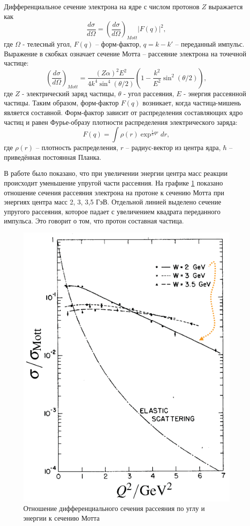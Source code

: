 \documentclass{extarticle}
\begin{document}
Дифференциальное сечение электрона на ядре с числом протонов $Z$ выражается как 
\begin{equation}
    \frac{d\sigma}{d\Omega} = ( \frac{d\sigma}{d\Omega})_{Mott} |F(q)|^2 ,
\end{equation}
где $\Omega$ - телесный угол, $F(q)$ -- форм-фактор, $q = k-k'$ -- переданный импульс. Выражение в скобках означает сечение Мотта -- рассеяние электрона на точечной частице:
\begin{equation}
    (\frac{d\sigma}{d\Omega})_{Mott} = \frac{(Z\alpha)^2 E^2}{4k^4 \sin^4 (\theta/2)} (1- \frac{k^2}{E^2} \sin^2(\theta/2)),
\end{equation}
где $Z$ - электрический заряд частицы, $\theta$ - угол рассеяния, $E$ - энергия рассеянной частицы. Таким образом, форм-фактор $F(q)$ возникает, когда частица-мишень является составной. Форм-фактор зависит от распределения составляющих ядро частиц и равен Фурье-образу плотности распределения электрического заряда:
\begin{equation}
    F(q) = \int \rho(r) \exp^{\frac{i}{\hbar}qr}dr,
\end{equation}
где $\rho(r)$ -- плотность распределения, $r$ -- радиус-вектор из центра ядра, $\hbar$ -- приведённая постоянная Планка.

В работе \cite{Breidenbach} было показано, что при увеличении энергии центра масс реакции происходит уменьшение упругой части рассеяния. На графике \ref{fig:Mott} показано отношение сечения рассеяния электрона на протоне к сечению Мотта при энергиях центра масс 2, 3, 3,5 ГэВ. Отдельной линией выделено сечение упругого рассеяния, которое падает с увеличением квадрата переданного импульса. Это говорит о том, что протон составная частица. 
\begin{figure}[h]
    \centering
    \includegraphics[width = 0.6\linewidth]{Mott.png}
    \caption{Отношение дифференциального сечения рассеяния по углу и энергии к сечению Мотта \cite{Breidenbach}}
    \label{fig:Mott}
\end{figure}
\end{document}
